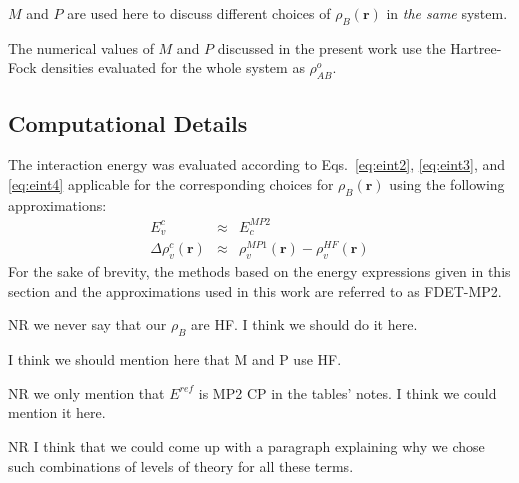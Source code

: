 \documentclass[journal=jctcce,manuscript=article]{achemso}
\newcommand{\nr}[1]{\color{red}#1\color{black}}
\begin{document}
$M$ and $P$  are used here to discuss different choices of $\rho_{B}(\mathbf{r})$ in {\it the same} system. 

The numerical values of $M$ and $P$ discussed in the present work use the Hartree-Fock densities evaluated for the whole system  as $\rho^{o}_{AB}$. 
\subsection{Computational Details}
The interaction energy was evaluated according to Eqs.~\ref{eq:eint2}, \ref{eq:eint3}, and \ref{eq:eint4} applicable for the corresponding choices for $\rho_B(\mathbf{r})$ using the following approximations:
\begin{eqnarray}
E^{c}_{v}&\approx&E_c^{MP2} \label{eq:appr_ec}\\
\Delta \rho^{c}_{v}(\mathbf{r})&\approx&\rho_v^{MP1}(\mathbf{r})-\rho_v^{HF}(\mathbf{r}) \label{eq:appr_rc}
\end{eqnarray}
For the sake of \nr{brevity}, the methods based on the energy expressions given in this section and \nr{the approximations used in this work } are referred to as FDET-MP2. 

\nr{NR we never say that our $\rho_B$ are HF. I think we should do it here.}

\nr{I think we should mention here that M and P use HF.}

\nr{NR we only mention that $E^{ref}$ is MP2 CP in the tables' notes. I think we could mention it here.}

\nr{NR I think that we could come up with a paragraph explaining why we chose such combinations of levels of theory for all these terms.}
\end{document}
